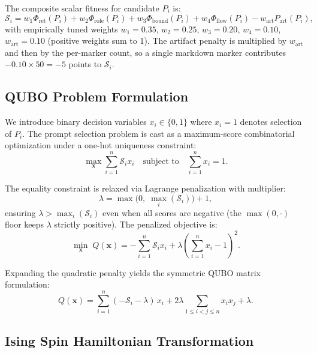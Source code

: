 \documentclass[11pt,a4paper]{article}
\begin{document}
The composite scalar fitness for candidate $P_i$ is:
\begin{equation}
\mathcal{S}_i = w_1 \Phi_{\text{ret}}(P_i) + w_2 \Phi_{\text{role}}(P_i) + w_3 \Phi_{\text{bound}}(P_i) + w_4 \Phi_{\text{flow}}(P_i) - w_{\text{art}} P_{\text{art}}(P_i),
\label{eq:fitness}
\end{equation}
with empirically tuned weights $w_1 = 0.35$, $w_2 = 0.25$, $w_3 = 0.20$, $w_4 = 0.10$, $w_{\text{art}} = 0.10$ (positive weights sum to 1). The artifact penalty is multiplied by $w_{\text{art}}$ and then by the per-marker count, so a single markdown marker contributes $-0.10 \times 50 = -5$ points to $\mathcal{S}_i$.

\subsection{QUBO Problem Formulation}
\label{subsec:qubo_formulation}

We introduce binary decision variables $x_i \in \{0, 1\}$ where $x_i = 1$ denotes selection of $P_i$. The prompt selection problem is cast as a maximum-score combinatorial optimization under a one-hot uniqueness constraint:
\begin{equation}
\max_{\mathbf{x}} \sum_{i=1}^n \mathcal{S}_i x_i \quad \text{subject to} \quad \sum_{i=1}^n x_i = 1.
\label{eq:constrained}
\end{equation}

The equality constraint is relaxed via Lagrange penalization with multiplier:
\begin{equation}
\lambda = \max\bigl(0,\; \max_i(\mathcal{S}_i)\bigr) + 1,
\label{eq:lambda}
\end{equation}
ensuring $\lambda > \max_i(\mathcal{S}_i)$ even when all scores are negative (the $\max(0,\cdot)$ floor keeps $\lambda$ strictly positive). The penalized objective is:
\begin{equation}
\min_{\mathbf{x}}\; Q(\mathbf{x}) = -\sum_{i=1}^n \mathcal{S}_i x_i + \lambda \left(\sum_{i=1}^n x_i - 1\right)^2.
\label{eq:lagrange}
\end{equation}

Expanding the quadratic penalty yields the symmetric QUBO matrix formulation:
\begin{equation}
Q(\mathbf{x}) = \sum_{i=1}^n (-\mathcal{S}_i - \lambda)\, x_i + 2\lambda \sum_{1 \le i < j \le n} x_i x_j + \lambda.
\label{eq:qubo_matrix}
\end{equation}

\subsection{Ising Spin Hamiltonian Transformation}
\label{subsec:ising}
\end{document}
